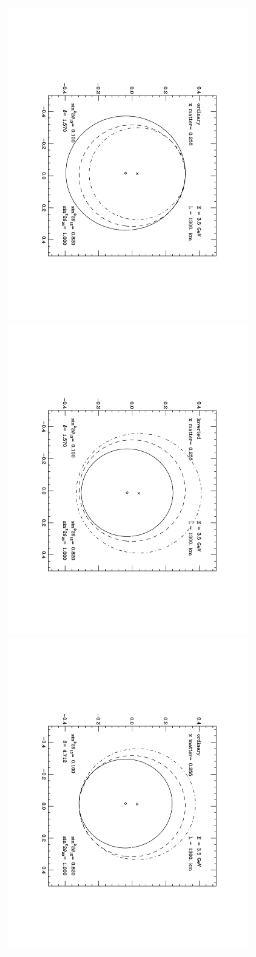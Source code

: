 \begin{figure}[hbp]\begin{center}
\includegraphics[width=2.5in,angle=90]{RNC/cpv_lbne_pibytwo.pdf}
\includegraphics[width=2.5in,angle=90]{RNC/cpv_lbne_pibytwo_inv.pdf}
\includegraphics[width=2.5in,angle=90]{RNC/cpv_lbne_threepibytwo.pdf}

\end{center}
\end{figure}
